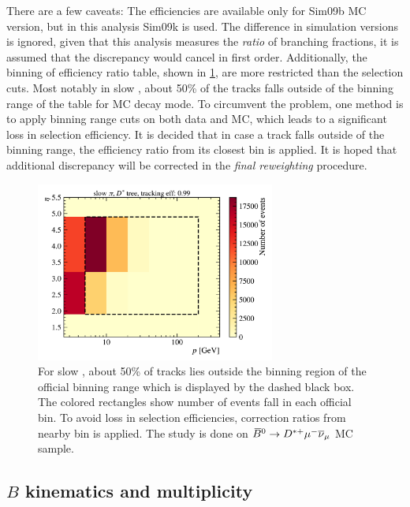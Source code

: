 There are a few caveats: The efficiencies are available only for Sim09b MC
version, but in this analysis Sim09k is used.
The difference in simulation versions is ignored, given that this analysis
measures the \emph{ratio} of branching fractions, it is assumed that the
discrepancy would cancel in first order.
Additionally, the binning of \trackcalib efficiency ratio table,
shown in \cref{fig:trackcalib-slow-pi}, are more restricted than the selection
cuts.
Most notably in slow \pion, about 50\% of the tracks falls outside of the
binning range of the table for \Dstarp\mun MC decay mode.
To circumvent the problem, one method is to apply \trackcalib binning range cuts
on both data and MC, which leads to a significant loss in selection efficiency.
It is decided that in case a track falls outside of the binning range, the
efficiency ratio from its closest bin is applied.
It is hoped that additional discrepancy will be corrected in the
\emph{final reweighting} procedure.

\begin{figure}[htb]
    \centering
    \includegraphics[width=0.7\textwidth]{./figs-mc-correction/reweighting-tracking/Dst_spi_p_eta.pdf}
    \caption{
        For slow \pion, about 50\% of tracks lies outside the binning region
        of the official \trackcalib binning range which is displayed by the
        dashed black box.
        The colored rectangles show number of events fall in each
        official \trackcalib bin.
        To avoid loss in selection efficiencies,
        correction ratios from nearby bin is applied.
        The study is done on ${{\kern 0.18em\overline{\kern -0.18em B}}{}^0} \rightarrow {\ensuremath{{D}^{*+}}} {\ensuremath{\mu^-}} {\ensuremath{{\overline{\nu}}_\mu}}$ MC sample.
    }
    \label{fig:trackcalib-slow-pi}
\end{figure}


\subsection{$B$ kinematics and multiplicity}
\label{sec:data-mc:init-rwt:jpsi-k-correction}

